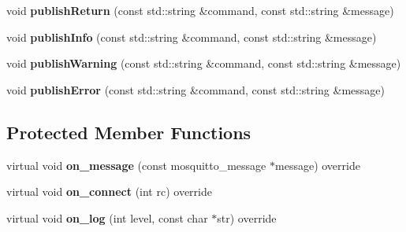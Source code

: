 \begin{DoxyCompactItemize}
\item 
\mbox{\label{class_command_processor_ae97c2e58deecce8bd6dac0d081d73f03}} 
void {\bfseries publish\+Return} (const std\+::string \&command, const std\+::string \&message)
\item 
\mbox{\label{class_command_processor_a0f5c17ab23203abee8a48c82f3338a28}} 
void {\bfseries publish\+Info} (const std\+::string \&command, const std\+::string \&message)
\item 
\mbox{\label{class_command_processor_a0691a985030ebb0cef833aa779bedeab}} 
void {\bfseries publish\+Warning} (const std\+::string \&command, const std\+::string \&message)
\item 
\mbox{\label{class_command_processor_a81e3fda8d03c8f5aea99a442ebdb0050}} 
void {\bfseries publish\+Error} (const std\+::string \&command, const std\+::string \&message)
\end{DoxyCompactItemize}
\subsection*{Protected Member Functions}
\begin{DoxyCompactItemize}
\item 
\mbox{\label{class_command_processor_ab1a2cf5d74c8bbd9bbcf57c7a4b14c66}} 
virtual void {\bfseries on\+\_\+message} (const mosquitto\+\_\+message $\ast$message) override
\item 
\mbox{\label{class_command_processor_a242db95796f5dd1b17a139ed19d6ecfa}} 
virtual void {\bfseries on\+\_\+connect} (int rc) override
\item 
\mbox{\label{class_command_processor_a7300ca2e9cd0237f17ce82f64123e553}} 
virtual void {\bfseries on\+\_\+log} (int level, const char $\ast$str) override
\end{DoxyCompactItemize}
